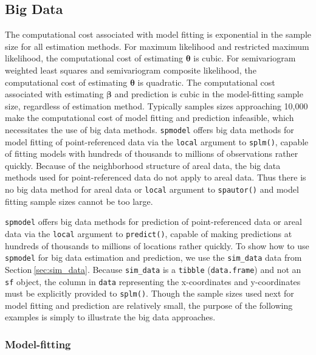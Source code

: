 \documentclass{article}
\begin{document}
\hypertarget{big-data}{%
\subsection{Big Data}\label{big-data}}

The computational cost associated with model fitting is exponential in
the sample size for all estimation methods. For maximum likelihood and
restricted maximum likelihood, the computational cost of estimating
\(\boldsymbol{\theta}\) is cubic. For semivariogram weighted least
squares and semivariogram composite likelihood, the computational cost
of estimating \(\boldsymbol{\theta}\) is quadratic. The computational
cost associated with estimating \(\boldsymbol{\beta}\) and prediction is
cubic in the model-fitting sample size, regardless of estimation method.
Typically samples sizes approaching 10,000 make the computational cost
of model fitting and prediction infeasible, which necessitates the use
of big data methods. \texttt{spmodel} offers big data methods for model
fitting of point-referenced data via the \texttt{local} argument to
\texttt{splm()}, capable of fitting models with hundreds of thousands to
millions of observations rather quickly. Because of the neighborhood
structure of areal data, the big data methods used for point-referenced
data do not apply to areal data. Thus there is no big data method for
areal data or \texttt{local} argument to \texttt{spautor()} and model
fitting sample sizes cannot be too large.

\texttt{spmodel} offers big data methods for prediction of
point-referenced data or areal data via the \texttt{local} argument to
\texttt{predict()}, capable of making predictions at hundreds of
thousands to millions of locations rather quickly. To show how to use
\texttt{spmodel} for big data estimation and prediction, we use the
\texttt{sim\_data} data from Section\(~\)\ref{sec:sim_data}. Because
\texttt{sim\_data} is a \texttt{tibble} (\texttt{data.frame}) and not an
\texttt{sf} object, the column in \texttt{data} representing the
x-coordinates and y-coordinates must be explicitly provided to
\texttt{splm()}. Though the sample sizes used next for model fitting and
prediction are relatively small, the purpose of the following examples
is simply to illustrate the big data approaches.

\hypertarget{model-fitting}{%
\subsubsection{Model-fitting}\label{model-fitting}}
\end{document}
